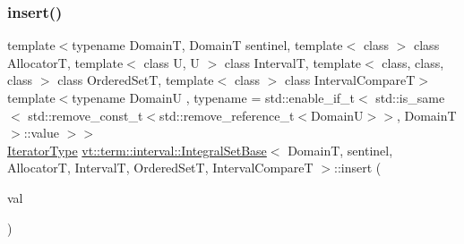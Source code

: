 \subsubsection{\texorpdfstring{insert()}{insert()}\hspace{0.1cm}{\footnotesize\ttfamily [1/2]}}
{\footnotesize\ttfamily template$<$typename DomainT, DomainT sentinel, template$<$ class $>$ class AllocatorT, template$<$ class U, U $>$ class IntervalT, template$<$ class, class, class $>$ class Ordered\+SetT, template$<$ class $>$ class Interval\+CompareT$>$ \\
template$<$typename DomainU , typename  = std\+::enable\+\_\+if\+\_\+t$<$      std\+::is\+\_\+same$<$        std\+::remove\+\_\+const\+\_\+t$<$std\+::remove\+\_\+reference\+\_\+t$<$\+Domain\+U$>$$>$, Domain\+T      $>$\+::value    $>$$>$ \\
\hyperlink{structvt_1_1term_1_1interval_1_1_integral_set_base_a111b2ec1ea960a40ba4270be702f11f1}{Iterator\+Type} \hyperlink{structvt_1_1term_1_1interval_1_1_integral_set_base}{vt\+::term\+::interval\+::\+Integral\+Set\+Base}$<$ DomainT, sentinel, AllocatorT, IntervalT, Ordered\+SetT, Interval\+CompareT $>$\+::insert (\begin{DoxyParamCaption}\item[{DomainU \&\&}]{val }\end{DoxyParamCaption})\hspace{0.3cm}{\ttfamily [inline]}}

\mbox{\label{structvt_1_1term_1_1interval_1_1_integral_set_base_a34422ad0f4a5341e700a9264f921381d}} 
